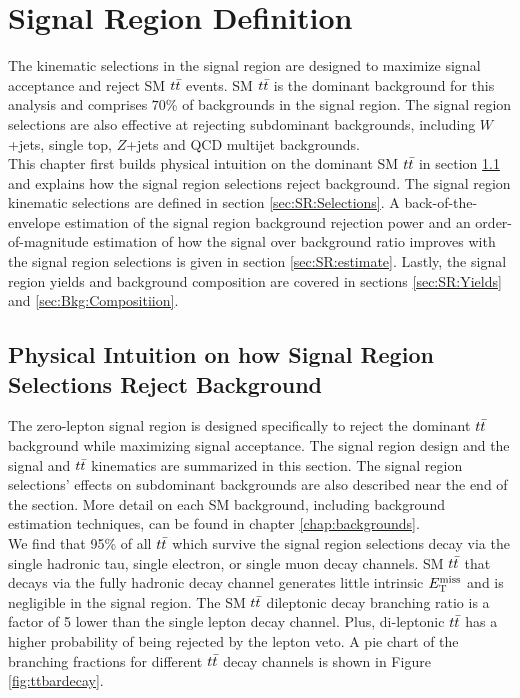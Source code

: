 
\chapter{Signal Region Definition}
\label{chap:SignalRegion}

\indent The kinematic selections in the signal region are designed to maximize signal acceptance and reject SM $t\bar{t}$ events.  SM $t\bar{t}$ is the dominant background for this analysis and comprises $70$\% of backgrounds in the signal region.  The signal region selections are also effective at rejecting subdominant backgrounds, including $W$+jets, single top, $Z$+jets and QCD multijet backgrounds.  \\

\indent This chapter first builds physical intuition on the dominant SM $t\bar{t}$ in section \ref{sec:SR:physical} and explains how the signal region selections reject background.  The signal region kinematic selections are defined in section \ref{sec:SR:Selections}.  A back-of-the-envelope estimation of the signal region background rejection power and an order-of-magnitude estimation of how the signal over background ratio improves with the signal region selections is given in section \ref{sec:SR:estimate}. Lastly, the signal region yields and background composition are covered in sections \ref{sec:SR:Yields} and \ref{sec:Bkg:Compositiion}.  \\

\section{Physical Intuition on how Signal Region Selections Reject Background}
\label{sec:SR:physical}

\indent The zero-lepton signal region is designed specifically to reject the dominant $t\bar{t}$ background while maximizing signal acceptance.  The signal region design and the signal and $t\bar{t}$ kinematics are summarized in this section.  The signal region selections' effects on subdominant backgrounds are also described near the end of the section. More detail on each SM background, including background estimation techniques, can be found in chapter \ref{chap:backgrounds}. \\

\indent  We find that 95\% of all $t\bar{t}$ which survive the signal region selections decay via the single hadronic tau, single electron, or single muon decay channels.  SM $t\bar{t}$ that decays via the fully hadronic decay channel generates little intrinsic $E_{\mathrm{T}}^{\mathrm{miss}}$ and is negligible in the signal region.  The SM $t\bar{t}$ dileptonic decay branching ratio is a factor of 5 lower than the single lepton decay channel. Plus, di-leptonic $t\bar{t}$ has a higher probability of being rejected by the lepton veto.  A pie chart of the branching fractions for different $t\bar{t}$ decay channels is shown in Figure \ref{fig:ttbardecay}. \\


